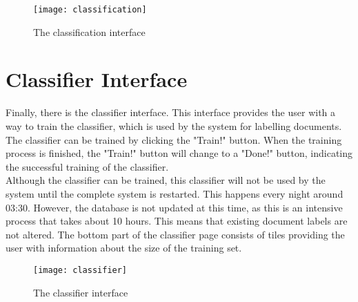 \begin{figure}[H]
    \centering
    \texttt{[image: classification]}
    \caption{The classification interface}
    \label{fig:classification}
\end{figure}

\section{Classifier Interface}

Finally, there is the classifier interface. This interface provides the user with a way to train the classifier, which is used by the system for labelling documents.\\
The classifier can be trained by clicking the "Train!" button. When the training process is finished, the "Train!" button will change to a "Done!" button, indicating the successful training of the classifier.\\ 
Although the classifier can be trained, this classifier will not be used by the system until the complete system is restarted. This happens every night around 03:30. However, the database is not updated at this time, as this is an intensive process that takes about 10 hours. This means that existing document labels are not altered.
The bottom part of the classifier page consists of tiles providing the user with information about the size of the training set.

\begin{figure}[H]
    \centering
    \texttt{[image: classifier]}
    \caption{The classifier interface}
    \label{fig:classifier}
\end{figure}

